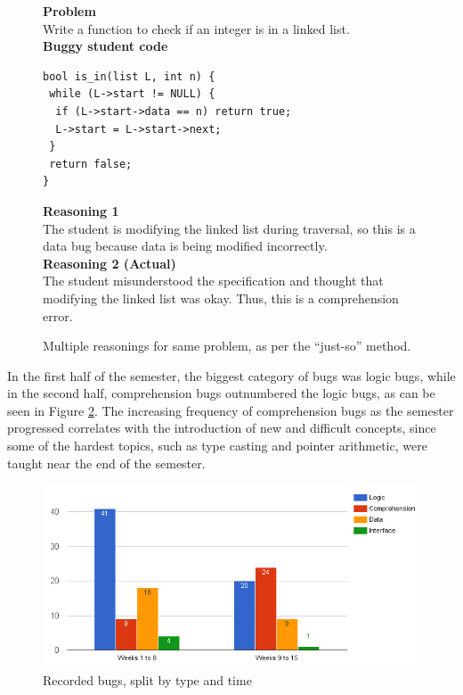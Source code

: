 \documentclass{sig-alternate}
\begin{document}
\begin{figure}
\begin{framed}
\setlength{\parindent}{0cm}
\textbf{Problem}\\
Write a function to check if an integer is in a linked list.\\

\textbf{Buggy student code}
\vspace{-0.05in}
\begin{verbatim}
bool is_in(list L, int n) {
 while (L->start != NULL) {
  if (L->start->data == n) return true;
  L->start = L->start->next;
 }
 return false;
}
\end{verbatim}

\textbf{Reasoning 1}\\

The student is modifying the linked list during traversal, so this is
a data bug because data is being modified incorrectly.\\

\textbf{Reasoning 2 (Actual)}\\

The student misunderstood the specification and thought that modifying
the linked list was okay. Thus, this is a comprehension error.

\end{framed}
\vspace{-0.1in}
\caption{Multiple reasonings for same problem, as per the ``just-so'' method.}
\label{fig:incorrect}
\end{figure}


In the first half of the semester, the biggest category of bugs was
logic bugs, while in the second half, comprehension bugs outnumbered the
logic bugs, as can be seen in Figure \ref{fig:types}. The increasing
frequency of comprehension bugs as the semester progressed correlates
with the introduction of new and difficult concepts, since some of the
hardest topics, such as type casting and pointer arithmetic, were
taught near the end of the semester.\\


\begin{figure}
\centering
\includegraphics[scale=0.38]{figures/types.png}
\caption{Recorded bugs, split by type and time}
\label{fig:types}
\end{figure}
\end{document}
